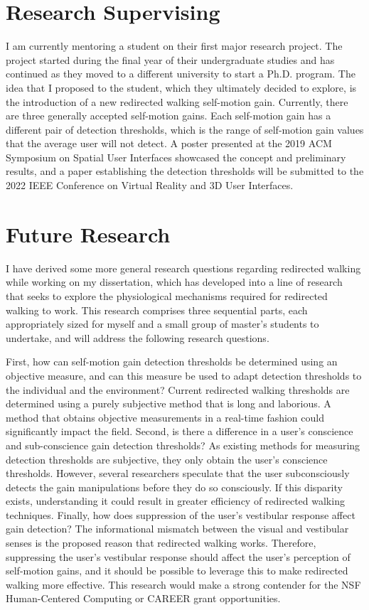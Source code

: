 \section*{Research Supervising}
\vspace{-0.5cm}
I am currently mentoring a student on their first major research project. The project started during the final year of their undergraduate studies and has continued as they moved to a different university to start a Ph.D. program. The idea that I proposed to the student, which they ultimately decided to explore, is the introduction of a new redirected walking self-motion gain. Currently, there are three generally accepted self-motion gains. Each self-motion gain has a different pair of detection thresholds, which is the range of self-motion gain values that the average user will not detect. A poster presented at the 2019 ACM Symposium on Spatial User Interfaces showcased the concept and preliminary results, and a paper establishing the detection thresholds will be submitted to the 2022 IEEE Conference on Virtual Reality and 3D User Interfaces.

\section*{Future Research}
\vspace{-0.5cm}
I have derived some more general research questions regarding redirected walking while working on my dissertation, which has developed into a line of research that seeks to explore the physiological mechanisms required for redirected walking to work. This research comprises three sequential parts, each appropriately sized for myself and a small group of master’s students to undertake, and will address the following research questions.

First, how can self-motion gain detection thresholds be determined using an objective measure, and can this measure be used to adapt detection thresholds to the individual and the environment? Current redirected walking thresholds are determined using a purely subjective method that is long and laborious. A method that obtains objective measurements in a real-time fashion could significantly impact the field. Second, is there a difference in a user’s conscience and sub-conscience gain detection thresholds? As existing methods for measuring detection thresholds are subjective, they only obtain the user’s conscience thresholds. However, several researchers speculate that the user subconsciously detects the gain manipulations before they do so consciously. If this disparity exists, understanding it could result in greater efficiency of redirected walking techniques. Finally, how does suppression of the user’s vestibular response affect gain detection? The informational mismatch between the visual and vestibular senses is the proposed reason that redirected walking works. Therefore, suppressing the user’s vestibular response should affect the user’s perception of self-motion gains, and it should be possible to leverage this to make redirected walking more effective. This research would make a strong contender for the NSF Human-Centered Computing or CAREER grant opportunities.

